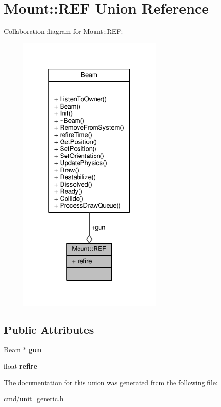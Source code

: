 \hypertarget{unionMount_1_1REF}{}\section{Mount\+:\+:R\+EF Union Reference}
\label{unionMount_1_1REF}


Collaboration diagram for Mount\+:\+:R\+EF\+:
\nopagebreak
\begin{figure}[H]
\begin{center}
\leavevmode
\includegraphics[width=205pt]{d6/dc4/unionMount_1_1REF__coll__graph}
\end{center}
\end{figure}
\subsection*{Public Attributes}
\begin{DoxyCompactItemize}
\item 
\hyperlink{classBeam}{Beam} $\ast$ {\bfseries gun}\hypertarget{unionMount_1_1REF_a58f308c99f62395ea37b340e627bef36}{}\label{unionMount_1_1REF_a58f308c99f62395ea37b340e627bef36}

\item 
float {\bfseries refire}\hypertarget{unionMount_1_1REF_ad69847c10498c012d0140f8daaf7b920}{}\label{unionMount_1_1REF_ad69847c10498c012d0140f8daaf7b920}

\end{DoxyCompactItemize}


The documentation for this union was generated from the following file\+:\begin{DoxyCompactItemize}
\item 
cmd/unit\+\_\+generic.\+h\end{DoxyCompactItemize}
